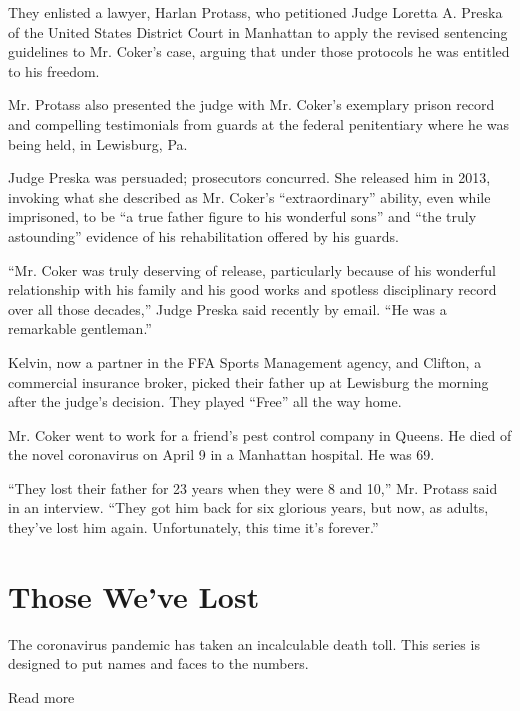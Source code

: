 They enlisted a lawyer, Harlan Protass, who petitioned Judge Loretta A.
Preska of the United States District Court in Manhattan to apply the
revised sentencing guidelines to Mr. Coker's case, arguing that under
those protocols he was entitled to his freedom.

Mr. Protass also presented the judge with Mr. Coker's exemplary prison
record and compelling testimonials from guards at the federal
penitentiary where he was being held, in Lewisburg, Pa.

Judge Preska was persuaded; prosecutors concurred. She released him in
2013, invoking what she described as Mr. Coker's ``extraordinary''
ability, even while imprisoned, to be ``a true father figure to his
wonderful sons'' and ``the truly astounding'' evidence of his
rehabilitation offered by his guards.

``Mr. Coker was truly deserving of release, particularly because of his
wonderful relationship with his family and his good works and spotless
disciplinary record over all those decades,'' Judge Preska said recently
by email. ``He was a remarkable gentleman.''

Kelvin, now a partner in the FFA Sports Management agency, and Clifton,
a commercial insurance broker, picked their father up at Lewisburg the
morning after the judge's decision. They played ``Free'' all the way
home.

Mr. Coker went to work for a friend's pest control company in Queens. He
died of the novel coronavirus on April 9 in a Manhattan hospital. He was
69.

``They lost their father for 23 years when they were 8 and 10,'' Mr.
Protass said in an interview. ``They got him back for six glorious
years, but now, as adults, they've lost him again. Unfortunately, this
time it's forever.''

\href{https://www.nytimes.com/interactive/2020/obituaries/people-died-coronavirus-obituaries.html?action=click\&pgtype=Article\&state=default\&region=BELOW_MAIN_CONTENT\&context=covid_obits_promo}{}

\hypertarget{those-weve-lost}{%
\section{Those We've Lost}\label{those-weve-lost}}

The coronavirus pandemic has taken an incalculable death toll. This
series is designed to put names and faces to the numbers.

Read more

